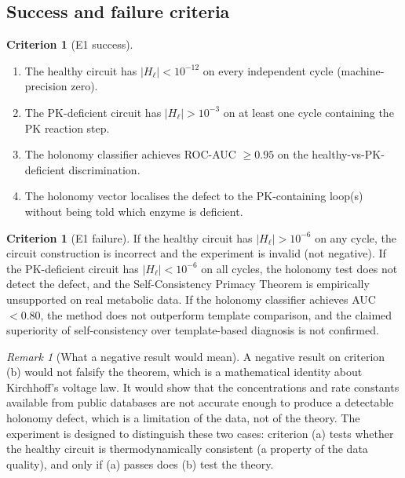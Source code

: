 \documentclass[11pt,a4paper]{article}
\theoremstyle{expthm}
\theoremstyle{definition}
\newtheorem{criterion}[theorem]{Criterion}
\theoremstyle{remark}
\newtheorem{remark}[theorem]{Remark}
\newcommand{\HolL}{H_\ell}
\newcommand{\abs}[1]{\lvert#1\rvert}
\begin{document}
\subsection{Success and failure criteria}

\begin{criterion}[E1 success]
\label{crit:e1-success}
\leavevmode
\begin{enumerate}[label=(\alph*),leftmargin=1.8em,itemsep=2pt]
\item The healthy circuit has $\abs{\HolL} < 10^{-12}$ on every
  independent cycle (machine-precision zero).
\item The PK-deficient circuit has $\abs{\HolL} > 10^{-3}$ on at
  least one cycle containing the PK reaction step.
\item The holonomy classifier achieves ROC-AUC $\geq 0.95$ on the
  healthy-vs-PK-deficient discrimination.
\item The holonomy vector localises the defect to the PK-containing
  loop(s) without being told which enzyme is deficient.
\end{enumerate}
\end{criterion}

\begin{criterion}[E1 failure]
\label{crit:e1-failure}
If the healthy circuit has $\abs{\HolL} > 10^{-6}$ on any cycle, the
circuit construction is incorrect and the experiment is invalid (not
negative). If the PK-deficient circuit has $\abs{\HolL} < 10^{-6}$ on
all cycles, the holonomy test does not detect the defect, and the
Self-Consistency Primacy Theorem is empirically unsupported on real
metabolic data. If the holonomy classifier achieves AUC $< 0.80$, the
method does not outperform template comparison, and the claimed
superiority of self-consistency over template-based diagnosis is not
confirmed.
\end{criterion}

\begin{remark}[What a negative result would mean]
A negative result on criterion (b) would not falsify the theorem, which
is a mathematical identity about Kirchhoff's voltage law. It would show
that the concentrations and rate constants available from public databases
are not accurate enough to produce a detectable holonomy defect, which is
a limitation of the data, not of the theory. The experiment is designed
to distinguish these two cases: criterion (a) tests whether the healthy
circuit is thermodynamically consistent (a property of the data quality),
and only if (a) passes does (b) test the theory.
\end{remark}
\end{document}
